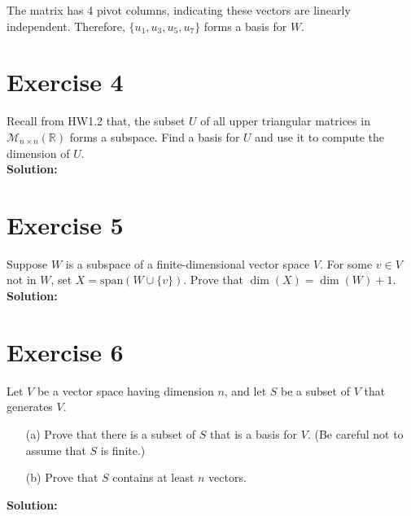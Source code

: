 \documentclass{article}
\begin{document}
The matrix has 4 pivot columns, indicating these vectors are linearly independent. Therefore, $\{u_1, u_3, u_5, u_7\}$ forms a basis for $W$.

\newpage

\section*{Exercise 4}
Recall from HW1.2 that, the subset $U$ of all upper triangular matrices in $\mathcal{M}_{n\times n}(\mathbb{R})$ forms a subspace. Find a basis for $U$ and use it to compute the dimension of $U$. \\

\textbf{Solution:} \\



\newpage

\section*{Exercise 5}
Suppose $W$ is a subspace of a finite-dimensional vector space $V$. For some $v \in V$ not in $W$, set $X = \text{span}(W \cup \{v\})$. Prove that $\dim(X) = \dim(W) + 1$. \\

\textbf{Solution:} \\

\newpage

\section*{Exercise 6}
Let $V$ be a vector space having dimension $n$, and let $S$ be a subset of $V$ that generates $V$.
\begin{itemize}
\item[(a)] Prove that there is a subset of $S$ that is a basis for $V$. (Be careful not to assume that $S$ is finite.)
\item[(b)] Prove that $S$ contains at least $n$ vectors.
\end{itemize}

\textbf{Solution:} \\
\end{document}
